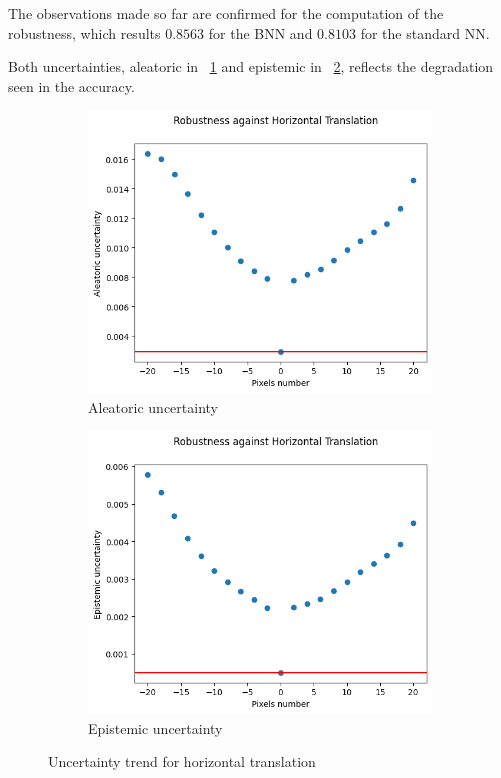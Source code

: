 The observations made so far are confirmed for the computation of the robustness, which results $0.8563$ for the BNN and $0.8103$ for the standard NN.

Both uncertainties, aleatoric in \Fig~\ref{fig:ht_aleatoric} and epistemic in \Fig~\ref{fig:ht_epistemic}, reflects the degradation seen in the accuracy.

\begin{figure}[h]
	\centering
	\begin{subfigure}{.5\textwidth}
		\centering
		\includegraphics[width=0.9\linewidth]{ImageFiles/EvalBNN/HT/aleatoric}
		\caption{Aleatoric uncertainty}
		\label{fig:ht_aleatoric}
	\end{subfigure}%
	\begin{subfigure}{.5\textwidth}
		\centering
		\includegraphics[width=0.9\linewidth]{ImageFiles/EvalBNN/HT/epistemic}
		\caption{Epistemic uncertainty}
		\label{fig:ht_epistemic}
	\end{subfigure}
	\caption{Uncertainty trend for horizontal translation}
	\label{fig:ht_uncertainty}
\end{figure}

